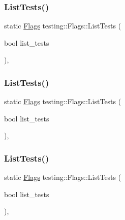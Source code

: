 \mbox{\label{structtesting_1_1_flags_a825a5d763a31fe6c28f543990bd336df}} 
\subsubsection{\texorpdfstring{ListTests()}{ListTests()}\hspace{0.1cm}{\footnotesize\ttfamily [1/3]}}
{\footnotesize\ttfamily static \mbox{\hyperlink{structtesting_1_1_flags}{Flags}} testing\+::\+Flags\+::\+List\+Tests (\begin{DoxyParamCaption}\item[{bool}]{list\+\_\+tests }\end{DoxyParamCaption})\hspace{0.3cm}{\ttfamily [inline]}, {\ttfamily [static]}}

\mbox{\label{structtesting_1_1_flags_a825a5d763a31fe6c28f543990bd336df}} 
\subsubsection{\texorpdfstring{ListTests()}{ListTests()}\hspace{0.1cm}{\footnotesize\ttfamily [2/3]}}
{\footnotesize\ttfamily static \mbox{\hyperlink{structtesting_1_1_flags}{Flags}} testing\+::\+Flags\+::\+List\+Tests (\begin{DoxyParamCaption}\item[{bool}]{list\+\_\+tests }\end{DoxyParamCaption})\hspace{0.3cm}{\ttfamily [inline]}, {\ttfamily [static]}}

\mbox{\label{structtesting_1_1_flags_a825a5d763a31fe6c28f543990bd336df}} 
\subsubsection{\texorpdfstring{ListTests()}{ListTests()}\hspace{0.1cm}{\footnotesize\ttfamily [3/3]}}
{\footnotesize\ttfamily static \mbox{\hyperlink{structtesting_1_1_flags}{Flags}} testing\+::\+Flags\+::\+List\+Tests (\begin{DoxyParamCaption}\item[{bool}]{list\+\_\+tests }\end{DoxyParamCaption})\hspace{0.3cm}{\ttfamily [inline]}, {\ttfamily [static]}}

